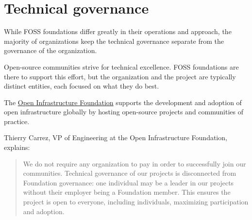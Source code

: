 


\chapter{Technical governance}

While FOSS foundations differ greatly in their operations and approach, the majority of organizations keep the technical governance separate from the governance of the organization.

Open-source communities strive for technical excellence.  FOSS foundations are there to support this effort, but the organization and the project are typically distinct entities, each focused on what they do best.

\begin{kaobox}[frametitle=Technical governance at the Open Infrastructure Foundation]

The \href{https://openinfra.dev/}{Open Infrastructure Foundation} supports the development and adoption of open infrastructure globally by hosting open-source projects and communities of practice.

Thierry Carrez, VP of Engineering at the Open Infrastructure Foundation, explains:

\begin{quote}

We do not require any organization to pay in order to successfully join our communities.  Technical governance of our projects is disconnected from Foundation governance: one individual may be a leader in our projects without their employer being a Foundation member.  This ensures the project is open to everyone, including individuals, maximizing participation and adoption.

\end{quote}

\end{kaobox}

